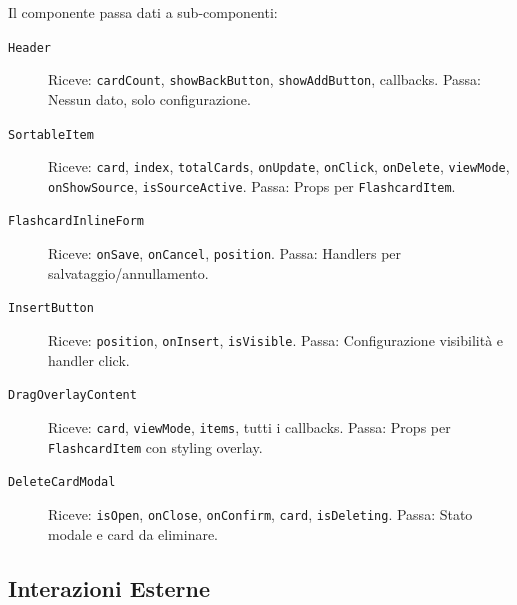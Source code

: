 \documentclass[11pt,a4paper]{article}
\begin{document}
Il componente passa dati a sub-componenti:

\begin{description}
    \item[\texttt{Header}] Riceve: \texttt{cardCount}, \texttt{showBackButton}, \texttt{showAddButton}, callbacks. Passa: Nessun dato, solo configurazione.
    
    \item[\texttt{SortableItem}] Riceve: \texttt{card}, \texttt{index}, \texttt{totalCards}, \texttt{onUpdate}, \texttt{onClick}, \texttt{onDelete}, \texttt{viewMode}, \texttt{onShowSource}, \texttt{isSourceActive}. Passa: Props per \texttt{FlashcardItem}.
    
    \item[\texttt{FlashcardInlineForm}] Riceve: \texttt{onSave}, \texttt{onCancel}, \texttt{position}. Passa: Handlers per salvataggio/annullamento.
    
    \item[\texttt{InsertButton}] Riceve: \texttt{position}, \texttt{onInsert}, \texttt{isVisible}. Passa: Configurazione visibilità e handler click.
    
    \item[\texttt{DragOverlayContent}] Riceve: \texttt{card}, \texttt{viewMode}, \texttt{items}, tutti i callbacks. Passa: Props per \texttt{FlashcardItem} con styling overlay.
    
    \item[\texttt{DeleteCardModal}] Riceve: \texttt{isOpen}, \texttt{onClose}, \texttt{onConfirm}, \texttt{card}, \texttt{isDeleting}. Passa: Stato modale e card da eliminare.
\end{description}

\subsection{Interazioni Esterne}
\end{document}

